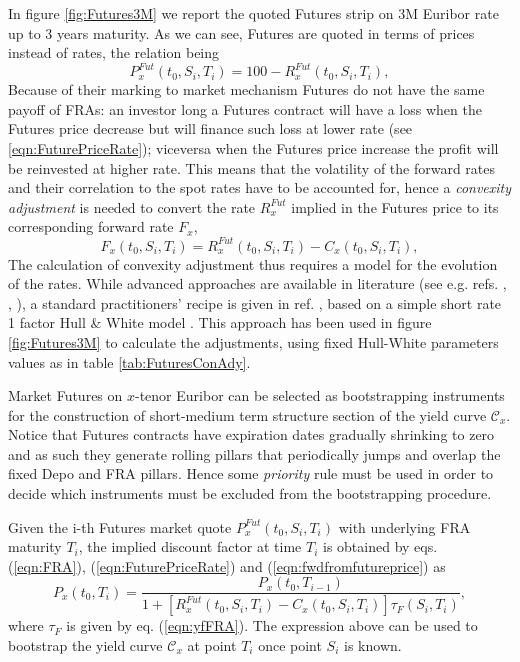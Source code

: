 \documentclass[11pt,reqno]{amsart}
\begin{document}
\par
In figure \ref{fig:Futures3M} we report the quoted Futures strip on 3M Euribor rate up to 3 years maturity. As we can see, Futures are quoted in terms of prices instead of rates, the relation being
\begin{equation}
P^{Fut}_x\left(t_0,S_i,T_i\right) = 100 - R^{Fut}_x\left(t_0,S_i,T_i\right),
\label{eqn:FuturePriceRate}
\end{equation}
Because of their marking to market mechanism Futures do not have the same payoff of FRAs: an investor long a Futures contract will have a loss when the Futures price decrease but will finance such loss at lower rate (see \ref{eqn:FuturePriceRate}); viceversa when the Futures price increase the profit will be reinvested at higher rate. This means that the volatility of the forward rates and their correlation to the spot rates have to be accounted for, hence a \emph{convexity adjustment} is needed to convert the rate $R^{Fut}_x$ implied in the Futures price to its corresponding forward rate $F_x$,
\begin{equation}
F_x\left(t_0,S_i,T_i\right) = R^{Fut}_x\left(t_0,S_i,T_i\right)-C_x\left(t_0,S_i,T_i\right),
\label{eqn:fwdfromfutureprice}
\end{equation}
The calculation of convexity adjustment thus requires a model for the evolution of the rates.  While advanced approaches are available in literature (see e.g. refs. \cite{Jac05}, \cite{PitRen06}, \cite{BriMer06}), a standard practitioners' recipe is given in ref. \cite{KirNov1997}, based on a simple short rate 1 factor Hull \& White model \cite{HulWhi1990}. This approach has been used in figure \ref{fig:Futures3M} to calculate the adjustments, using fixed Hull-White parameters values as in table \ref{tab:FuturesConAdy}.
\par
Market Futures on $x$-tenor Euribor can be selected as bootstrapping instruments for the construction of short-medium term structure section of the yield curve $\mathcal{C}_x$.
Notice that Futures contracts have expiration dates gradually shrinking to zero and as such they generate rolling pillars that periodically jumps and overlap the fixed Depo and FRA pillars. Hence some \emph{priority} rule must be used in order to decide which instruments must be excluded from the bootstrapping procedure.
\par
Given the i-th Futures market quote $P^{Fut}_x\left(t_0,S_i,T_i\right)$ with underlying FRA maturity $T_i$, the implied discount factor at time $T_i$ is obtained by eqs. (\ref{eqn:FRA}), (\ref{eqn:FuturePriceRate}) and (\ref{eqn:fwdfromfutureprice}) as
\begin{equation}
P_x\left(t_0,T_i\right)
=   \frac{P_x\left(t_0,T_{i-1}\right)}
         {1+\left[R^{Fut}_x\left(t_0,S_i,T_i\right) -
          C_x\left(t_0,S_i,T_i\right)\right]
          \tau_F\left(S_i,T_i\right)},
\label{eqn:FuturesBootstrap}
\end{equation}
where $\tau_F$ is given by eq. (\ref{eqn:yfFRA}). The expression above can be used to bootstrap the yield curve $\mathcal{C}_x$ at point $T_i$ once point $S_i$ is known.
\end{document}
